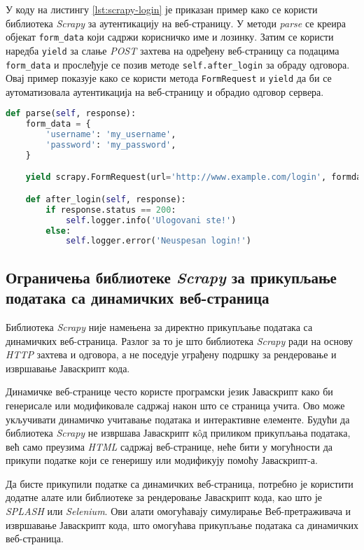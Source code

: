 \documentclass[12pt,oneside]{memoir}
\begin{document}
У коду на листингу \ref{lst:scrapy-login} је приказан пример како се користи библиотека \textit{Scrapy} за аутентикацију на веб-страницу. У методи \textit{parse} се креира објекат \texttt{form\_data} који садржи корисничко име и лозинку. Затим се користи наредба \texttt{yield} за слање \textit{POST} захтева на одређену веб-страницу са подацима \texttt{form\_data} и прослеђује се позив методе \texttt{self.after\_login} за обраду одговора. Овај пример показује како се користи метода \texttt{FormRequest} и \texttt{yield} да би се аутоматизовала аутентикација на веб-страницу и обрадио одговор сервера.
\begin{lstlisting}[language=Python, caption={Аутентикација у библиотеци \textit{Scrapy}}, label={lst:scrapy-login}]
def parse(self, response):
    form_data = {
        'username': 'my_username',
        'password': 'my_password',
    }

    yield scrapy.FormRequest(url='http://www.example.com/login', formdata=form_data, callback=self.after_login)

    def after_login(self, response):
        if response.status == 200:
            self.logger.info('Ulogovani ste!')
        else:
            self.logger.error('Neuspesan login!')
\end{lstlisting}

\subsection{Ограничења библиотеке \textit{Scrapy} за прикупљање података са динамичких веб-страница}
Библиотека \textit{Scrapy} није намењена за директно прикупљање података са динамичких веб-страница. Разлог за то је што библиотека \textit{Scrapy} ради на основу \textit{HTTP} захтева и одговора, а не поседује уграђену подршку за рендеровање и извршавање Јаваскрипт кода.

Динамичке веб-странице често користе програмски језик Јаваскрипт како би генерисале или модификовале садржај након што се страница учита. Ово може укључивати динамичко учитавање података и интерактивне елементе. Будући да библиотека \textit{Scrapy} не извршава Јаваскрипт кôд приликом прикупљања података, већ само преузима \textit{HTML} садржај веб-странице, неће бити у могућности да прикупи податке који се генеришу или модификују помоћу Јаваскрипт-а.

Да бисте прикупили податке са динамичких веб-страница, потребно је користити додатне алате или библиотеке за рендеровање Јаваскрипт кода, као што је \textit{SPLASH} или \textit{Selenium}. Ови алати омогућавају симулирање Веб-претраживача и извршавање Јаваскрипт кода, што омогућава прикупљање података са динамичких веб-страница.
\end{document}
